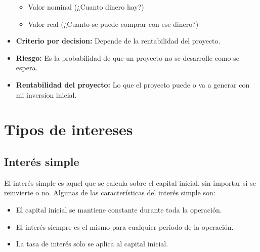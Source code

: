 \documentclass{templateNote}
\begin{document}
\begin{itemize}
    \begin{itemize}
        \item Valor nominal (¿Cuanto dinero hay?)
        \item Valor real (¿Cuanto se puede comprar con ese dinero?) 
    \end{itemize}
    \item \textbf{Criterio por decision:} Depende de la rentabilidad del proyecto.
    \item \textbf{Riesgo:} Es la probabilidad de que un proyecto no se desarrolle como se espera.
    \item \textbf{Rentabilidad del proyecto:} Lo que el proyecto puede o va a generar con mi inversion inicial.
\end{itemize}

\section{Tipos de intereses}
\subsection{Interés simple}
\noindent El interés simple es aquel que se calcula sobre el capital inicial, sin importar si se reinvierte o no. Algunas de las características del interés simple son:
\begin{itemize}
    \item El capital inicial se mantiene constante durante toda la operación.
    \item El interés siempre es el mismo para cualquier periodo de la operación.
    \item La tasa de interés solo se aplica al capital inicial.
\end{itemize}
\end{document}
